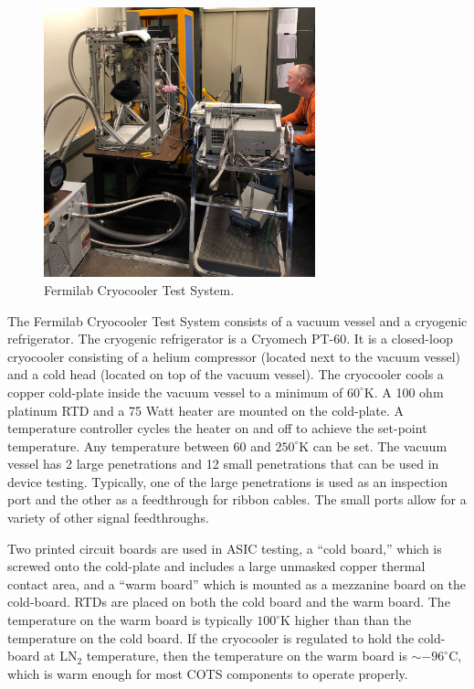 \label{sec:2.3}
\begin{figure}[htb]
\centering
\begin{center}
\includegraphics[width=0.7\textwidth]{figures/cryotestsystem.jpg}
\end{center}
\caption{Fermilab Cryocooler Test System.}
\label{fig:cryocoolertestsystem}
\end{figure}

The Fermilab Cryocooler Test System consists of a vacuum vessel and a cryogenic refrigerator. The cryogenic refrigerator is a Cryomech PT-60.  It is a closed-loop cryocooler consisting of a helium compressor (located next to the vacuum vessel) and a cold head (located on top of the vacuum vessel).  The cryocooler cools a copper cold-plate inside the vacuum vessel to a minimum of $60^{\circ}$K.  A 100 ohm platinum RTD and a 75 Watt heater are mounted on the cold-plate.  A temperature controller cycles the heater on and off to achieve the set-point temperature.  Any temperature between $60$ and $250^{\circ}$K can be set.
The vacuum vessel has 2 large penetrations and 12 small penetrations that can be used in device testing.  Typically, one of the large penetrations is used as an inspection port and the other as a feedthrough for ribbon cables.  The small ports allow for a variety of other signal feedthroughs.  

Two printed circuit boards are used in ASIC testing, a ``cold board,'' which is screwed onto the cold-plate and includes a large unmasked copper thermal contact area, and a ``warm board'' which is mounted as a mezzanine board on the cold-board.  RTDs are placed on both the cold board and the warm board.  The temperature on the warm board is typically $100^{\circ}$K higher than than the temperature on the cold board.  If the cryocooler is regulated to hold the cold-board at LN$_2$ temperature, then the temperature on the warm board is $\sim-96^{\circ}$C, which is warm enough for most COTS components to operate properly.

